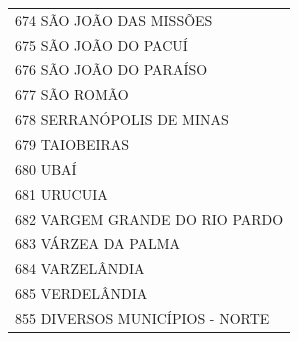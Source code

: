 \documentclass{article}
\begin{document}
\begin{longtable}[c]{m{18cm}}
\multicolumn{1}{l}{ \hspace{2em} 674 SÃO JOÃO DAS MISSÕES } \\
\multicolumn{1}{l}{ \hspace{2em} 675 SÃO JOÃO DO PACUÍ } \\
\multicolumn{1}{l}{ \hspace{2em} 676 SÃO JOÃO DO PARAÍSO } \\
\multicolumn{1}{l}{ \hspace{2em} 677 SÃO ROMÃO } \\
\multicolumn{1}{l}{ \hspace{2em} 678 SERRANÓPOLIS DE MINAS } \\
\multicolumn{1}{l}{ \hspace{2em} 679 TAIOBEIRAS } \\
\multicolumn{1}{l}{ \hspace{2em} 680 UBAÍ } \\
\multicolumn{1}{l}{ \hspace{2em} 681 URUCUIA } \\
\multicolumn{1}{l}{ \hspace{2em} 682 VARGEM GRANDE DO RIO PARDO } \\
\multicolumn{1}{l}{ \hspace{2em} 683 VÁRZEA DA PALMA } \\
\multicolumn{1}{l}{ \hspace{2em} 684 VARZELÂNDIA } \\
\multicolumn{1}{l}{ \hspace{2em} 685 VERDELÂNDIA } \\
\multicolumn{1}{l}{ \hspace{2em} 855 DIVERSOS MUNICÍPIOS - NORTE } \\
\end{longtable}
\newpage
\end{document}
